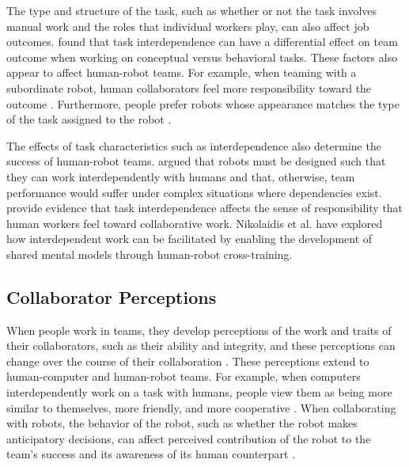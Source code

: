 The type and structure of the task, such as whether or not the task involves manual work and the roles that individual workers play, can also affect job outcomes. \citet{stewart2000team} found that task interdependence can have a differential effect on team outcome when working on conceptual versus behavioral tasks. These factors also appear to affect human-robot teams. For example, when teaming with a subordinate robot, human collaborators feel more responsibility toward the outcome \cite{hinds2004whose}. Furthermore, people prefer robots whose appearance matches the type of the task assigned to the robot \cite{goetz2003matching}.

The effects of task characteristics such as interdependence also determine the success of human-robot teams. \citet{johnson2012autonomy} argued that robots must be designed such that they can work interdependently with humans and that, otherwise, team performance would suffer under complex situations where dependencies exist. \citet{hinds2004whose} provide evidence that task interdependence affects the sense of responsibility that human workers feel toward collaborative work. Nikolaidis et al. \cite{nikolaidis2012human, nikolaidis2013human} have explored how interdependent work can be facilitated by enabling the development of shared mental models through human-robot cross-training.

\subsection{Collaborator Perceptions}
When people work in teams, they develop perceptions of the work and traits of their collaborators, such as their ability and integrity, and these perceptions can change over the course of their collaboration \cite{jarvenpaa1994global}. These perceptions extend to human-computer and human-robot teams. For example, when computers interdependently work on a task with humans, people view them as being more similar to themselves, more friendly, and more cooperative \cite{nass1996can}. When collaborating with robots, the behavior of the robot, such as whether the robot makes anticipatory decisions, can affect perceived contribution of the robot to the team's success \cite{hoffman2007effects} and its awareness of its human counterpart \cite{huang2015adaptive,huang2016anticipatory}.

